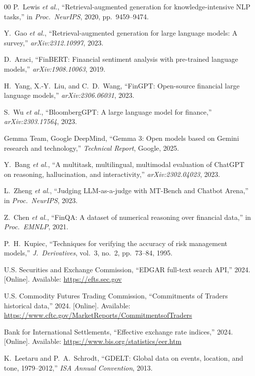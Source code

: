 \documentclass[conference]{IEEEtran}
\begin{document}
\begin{thebibliography}{00}
P.~Lewis \emph{et al.}, ``Retrieval-augmented generation for knowledge-intensive NLP tasks,''
in \emph{Proc.~NeurIPS}, 2020, pp.~9459--9474.

Y.~Gao \emph{et al.}, ``Retrieval-augmented generation for large language models: A survey,''
\emph{arXiv:2312.10997}, 2023.

D.~Araci, ``FinBERT: Financial sentiment analysis with pre-trained language models,''
\emph{arXiv:1908.10063}, 2019.

H.~Yang, X.-Y.~Liu, and C.~D.~Wang, ``FinGPT: Open-source financial large language models,''
\emph{arXiv:2306.06031}, 2023.

S.~Wu \emph{et al.}, ``BloombergGPT: A large language model for finance,''
\emph{arXiv:2303.17564}, 2023.

Gemma Team, Google DeepMind, ``Gemma 3: Open models based on Gemini research and technology,''
\emph{Technical Report}, Google, 2025.

Y.~Bang \emph{et al.}, ``A multitask, multilingual, multimodal evaluation of ChatGPT on reasoning, hallucination, and interactivity,''
\emph{arXiv:2302.04023}, 2023.

L.~Zheng \emph{et al.}, ``Judging LLM-as-a-judge with MT-Bench and Chatbot Arena,''
in \emph{Proc.~NeurIPS}, 2023.

Z.~Chen \emph{et al.}, ``FinQA: A dataset of numerical reasoning over financial data,''
in \emph{Proc.~EMNLP}, 2021.

P.~H.~Kupiec, ``Techniques for verifying the accuracy of risk management models,''
\emph{J.~Derivatives}, vol.~3, no.~2, pp.~73--84, 1995.

U.S. Securities and Exchange Commission, ``EDGAR full-text search API,'' 2024. [Online]. Available: \url{https://efts.sec.gov}

U.S. Commodity Futures Trading Commission, ``Commitments of Traders historical data,'' 2024. [Online]. Available: \url{https://www.cftc.gov/MarketReports/CommitmentsofTraders}

Bank for International Settlements, ``Effective exchange rate indices,'' 2024. [Online]. Available: \url{https://www.bis.org/statistics/eer.htm}

K.~Leetaru and P.~A.~Schrodt, ``GDELT: Global data on events, location, and tone, 1979--2012,''
\emph{ISA Annual Convention}, 2013.

\end{thebibliography}
\end{document}
